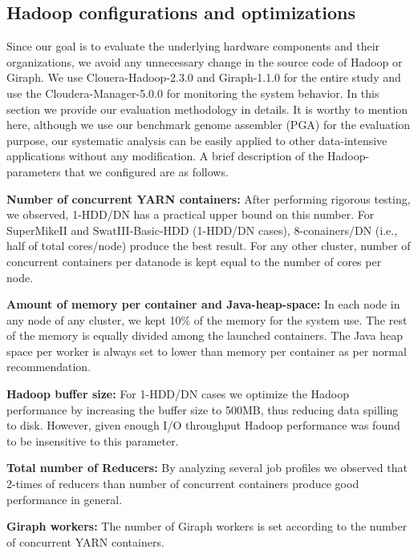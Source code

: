 \documentclass[10pt, conference, compsocconf]{IEEEtran}
\begin{document}
\subsection {Hadoop configurations and optimizations} \label{HadoopConfigurationsAndoptimizations}
Since our goal is to evaluate the underlying hardware components and their organizations, we avoid any unnecessary change in the source code of Hadoop or Giraph. We use Clouera-Hadoop-2.3.0 and Giraph-1.1.0 for the entire study and use the Cloudera-Manager-5.0.0 for monitoring the system behavior. In this section we provide our evaluation methodology in details. It is worthy to mention here, although we use our benchmark genome assembler (PGA) for the evaluation purpose, our systematic analysis can be easily applied to other data-intensive applications without any modification. A brief description of the Hadoop-parameters that we configured are as follows.
  
\textbf{Number of concurrent YARN containers:} After performing rigorous testing,  we observed, 1-HDD/DN has a practical upper bound on this number. For SuperMikeII and SwatIII-Basic-HDD (1-HDD/DN cases), 8-conainers/DN (i.e., half of total cores/node) produce the best result. For any other cluster, number of concurrent containers per datanode is kept equal to the number of cores per node. 

\textbf{Amount of memory per container and Java-heap-space:} In each node in any node of any cluster, we kept 10\% of the memory for the system use. The rest of the memory is equally divided among the launched containers. The Java heap space per worker is always set to lower than memory per container as per normal recommendation.

\textbf{Hadoop buffer size:} For 1-HDD/DN cases we optimize the Hadoop performance by increasing the buffer size to 500MB, thus reducing data spilling to disk. However, given enough I/O throughput Hadoop performance was found to be insensitive to this parameter.

\textbf{Total number of Reducers:} By analyzing several job profiles we observed that 2-times of reducers than number of concurrent containers produce good performance in general. 

\textbf{Giraph workers:} The number of Giraph workers is set according to the number of concurrent YARN containers.

\end{document}
